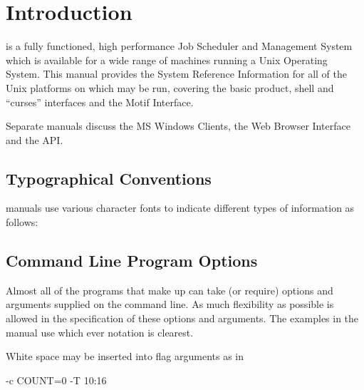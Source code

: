 \chapter{Introduction}
\label{chp:introduction}
\ProductName{} is a fully functioned, high performance Job Scheduler and
Management System which is available for a wide range of machines
running a Unix Operating System. This manual provides the System
Reference Information for all of the Unix platforms on which \ProductName{}
may be run, covering the basic product, shell and ``curses'' interfaces and the Motif
Interface.

Separate manuals discuss the MS Windows Clients, the Web Browser Interface and the API.

\section{Typographical Conventions}
 manuals use various character fonts to indicate different
types of information as follows:

\begin{center}





\end{center}

\section{Command Line Program Options}
Almost all of the programs that make up \ProductName{} can take (or require)
options and arguments supplied on the command line. As much flexibility
as possible is allowed in the specification of these options and
arguments. The examples in the manual use which ever notation is
clearest.

White space may be inserted into flag arguments as in

\begin{expara}

\BtrName{} -c COUNT=0 -T 10:16

\end{expara}

